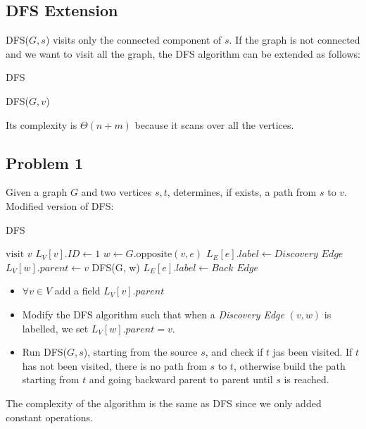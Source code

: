 \vspace{50pt}
\subsection{DFS Extension}
DFS($G, s$) visits only the connected component of $s$. If the graph is not connected and we want to visit all the graph, the DFS algorithm can be extended as follows:
\begin{algorithm}
\caption{DFS}\label{dfs_2}
    \begin{algorithmic}[1]
                \State DFS($G, v$)
            \EndIf
        \EndFor
    \EndProcedure
    \end{algorithmic}
\end{algorithm}\newline\newline
Its complexity is $\Theta(n + m)$ because it scans over all the vertices.

\subsection{Problem 1}
Given a graph $G$ and two vertices $s, t$, determines, if exists, a path from $s$ to $v$.\newline\newline
Modified version of DFS:
\begin{algorithm}
\caption{DFS}\label{modified_dfs}
    \begin{algorithmic}[1]
    \State $\text{visit } v$
    \State $L_{V}[v].ID \gets 1$
            \State $w \gets G.\text{opposite}(v, e)$
                \State $L_{E}[e].label \gets \textit{Discovery Edge}$
                \State $L_{V}[w].parent \gets v$
                \State DFS(G, w)
            \Else
                \State $L_{E}[e].label \gets \textit{Back Edge}$
            \EndIf
            
        \EndIf
    \EndFor
    \EndProcedure
    \end{algorithmic}
\end{algorithm}
\begin{itemize}
    \item $\forall v \in V$ add a field $L_{V}[v].parent$
    \item Modify the DFS algorithm such that when a \textit{Discovery Edge} $(v,w)$ is labelled, we set $L_{V}[w].parent = v$.
    \item Run DFS($G, s$), starting from the source $s$, and check if $t$ jas been visited. If $t$ has not been visited, there is no path from $s$ to $t$, otherwise build the path starting from $t$ and going backward parent to parent until $s$ is reached.
\end{itemize}
The complexity of the algorithm is the same as DFS since we only added constant operations.

